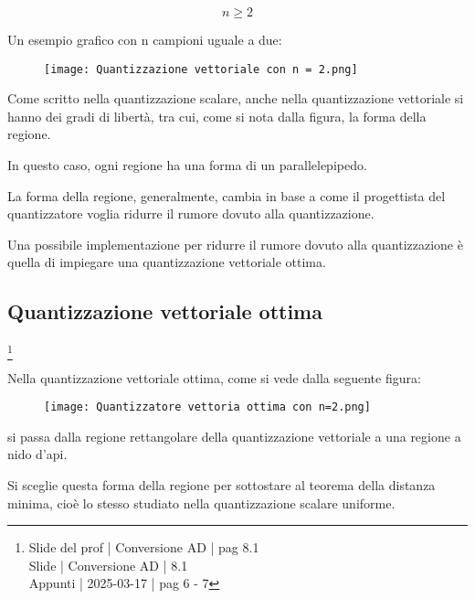 {
    \Large 
    \begin{equation}
        n \ge 2
    \end{equation}
}

Un esempio grafico con n campioni uguale a due: 

\begin{figure}[h]
    \centering
    \texttt{[image: Quantizzazione vettoriale con n = 2.png]}
\end{figure}

Come scritto nella quantizzazione scalare, anche nella quantizzazione vettoriale si hanno dei gradi di libertà, 
tra cui, come si nota dalla figura, la forma della regione. \newline 

In questo caso, ogni regione ha una forma di un parallelepipedo. \newline 

La forma della regione, generalmente, cambia in base a come il progettista del quantizzatore voglia ridurre il rumore dovuto alla quantizzazione. \newline 

Una possibile implementazione per ridurre il rumore dovuto alla quantizzazione è quella di impiegare una quantizzazione vettoriale ottima. \newline 

\newpage 

\subsection{Quantizzazione vettoriale ottima}
\footnote{Slide del prof | Conversione AD | pag 8.1\\
Slide | Conversione AD | 8.1\\  
Appunti | 2025-03-17 | pag 6 - 7
}

Nella quantizzazione vettoriale ottima, come si vede dalla seguente figura: 

\begin{figure}[h]
    \centering
    \texttt{[image: Quantizzatore vettoria ottima con n=2.png]}
\end{figure}

si passa dalla regione rettangolare della quantizzazione vettoriale a una regione a nido d'api. \newline 

Si sceglie questa forma della regione per sottostare al teorema della distanza minima, 
cioè lo stesso studiato nella quantizzazione scalare uniforme. \newline 

